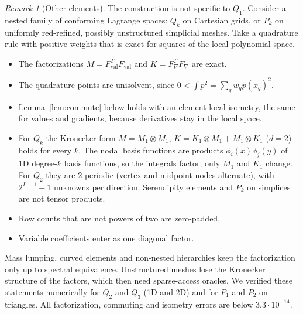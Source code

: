 \documentclass[11pt,a4paper]{article}
\theoremstyle{remark}
\newtheorem{remark}[theorem]{Remark}
\begin{document}
\begin{remark}[Other elements]\label{rem:elements}
The construction is not specific to $Q_1$. Consider a nested family of
conforming Lagrange spaces: $Q_k$ on Cartesian grids, or $P_k$ on uniformly
red-refined, possibly unstructured simplicial meshes. Take a quadrature rule
with positive weights that is exact for squares of the local polynomial
space.
\begin{itemize}
\item The factorizations $M=F_{\mathrm{val}}^TF_{\mathrm{val}}$ and $K=F_\nabla^TF_\nabla$ are
  exact.
\item The quadrature points are unisolvent, since $0<\int p^2=\sum_qw_qp(x_q)^2$.
\item Lemma~\ref{lem:commute} below holds with an element-local isometry,
  the same for values and gradients, because derivatives stay in the local
  space.
\item For $Q_k$ the Kronecker form $M=M_1\otimes M_1$, $K=K_1\otimes M_1+M_1\otimes K_1$
  ($d=2$) holds for every $k$. The nodal basis functions are products
  $\phi_i(x)\phi_j(y)$ of 1D degree-$k$ basis functions, so the integrals
  factor; only $M_1$ and $K_1$ change. For $Q_2$ they are 2-periodic (vertex
  and midpoint nodes alternate), with $2^{L+1}-1$ unknowns per direction.
  Serendipity elements and $P_k$ on simplices are not tensor products.
\item Row counts that are not powers of two are zero-padded.
\item Variable coefficients enter as one diagonal factor.
\end{itemize}
Mass lumping, curved elements and non-nested hierarchies keep the
factorization only up to spectral equivalence. Unstructured meshes lose the
Kronecker structure of the factors, which then need sparse-access oracles.
We verified these statements numerically for $Q_2$ and $Q_3$ (1D and 2D) and
for $P_1$ and $P_2$ on triangles. All factorization, commuting and isometry
errors are below $3.3\cdot10^{-14}$.
\end{remark}
\end{document}
